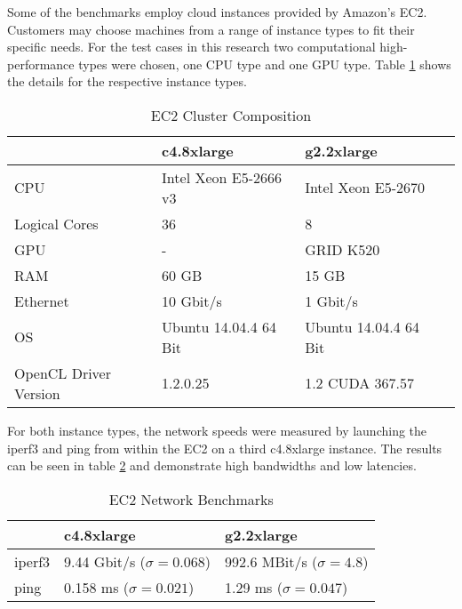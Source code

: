 Some of the benchmarks employ cloud instances provided by Amazon's EC2. Customers may choose machines from a range of instance types to fit their specific needs. For the test cases in this research two computational high-performance types were chosen, one CPU type and one GPU type. Table \ref{table:cluster_setup_ec2} shows the details for the respective instance types.

\begin{table}[!htb]
	\centering
	\begin{adjustbox}{width=0.65\textwidth}
		\small
		\begin{tabular}{l | l | l | l}
			~                     & c4.8xlarge                	& g2.2xlarge                 \\
			\hline
			CPU                   &  Intel Xeon E5-2666 v3 	& Intel Xeon E5-2670 \\
			Logical Cores         &  36 	& 8 \\
			GPU                   &  -						& GRID K520 \\
			RAM                   &  60 GB                       	& 15 GB                       \\
			Ethernet          &  10 Gbit/s                  	& 1 Gbit/s                  \\
			OS                    &  Ubuntu 14.04.4 64 Bit      	& Ubuntu 14.04.4 64 Bit      \\
			OpenCL Driver Version &  1.2.0.25                   & 1.2 CUDA 367.57        \\
		\end{tabular}
	\end{adjustbox}

	\caption{EC2 Cluster Composition}
	\label{table:cluster_setup_ec2}
\end{table}

For both instance types, the network speeds were measured by launching the iperf3 and ping from within the EC2 on a third c4.8xlarge instance. The results can be seen in table \ref{table:ec2_interconnect_benchmarks} and demonstrate high bandwidths and low latencies.

\begin{table}[!htb]
	\centering
	\begin{adjustbox}{width=0.5\textwidth}
		\small
		\begin{tabular}{l | l | l}
			~                     & c4.8xlarge               			& g2.2xlarge                \\
			\hline
			iperf3                & 9.44 Gbit/s ($\sigma = 0.068$) 	& 992.6 MBit/s ($\sigma = 4.8$) \\
			ping                  & 0.158 ms ($\sigma = 0.021$)  		& 1.29 ms ($\sigma = 0.047$)  \\
		\end{tabular}
	\end{adjustbox}

	\caption{EC2 Network Benchmarks}
	\label{table:ec2_interconnect_benchmarks}
\end{table}


